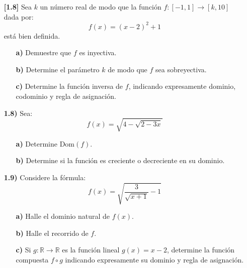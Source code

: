 \documentclass[letterpaper, 12pt]{article}
\begin{document}
\begin{enumerate}
    \item[\textbf{[1.8]}] Sea $k$ un número real de modo que la función $f:[-1,1]\rightarrow[k,10]$ dada por:
    \[
    f(x) = (x-2)^{2}+1
    \]
    está bien definida.
    \begin{itemize}
        \item[\textbf{a)}] Demuestre que $f$ es inyectiva.
        \item[\textbf{b)}] Determine el parámetro $k$ de modo que $f$ sea sobreyectiva.
        \item[\textbf{c)}] Determine la función inversa de $f$, indicando expresamente dominio, codominio y regla de asignación.
    \end{itemize}

    \item[\textbf{1.8)}] Sea:
    \[
    f(x) = \sqrt{4-\sqrt{2-3x}}
    \]
    \begin{itemize}
        \item[\textbf{a)}] Determine $\text{Dom}(f)$.
        \item[\textbf{b)}] Determine si la función es creciente o decreciente en su dominio.
    \end{itemize}

    \item[\textbf{1.9)}] Considere la fórmula:
    \[
    f(x) = \sqrt{\frac{3}{\sqrt{x+1}}-1}
    \]
    \begin{itemize}
        \item[\textbf{a)}] Halle el dominio natural de $f(x)$.
        \item[\textbf{b)}] Halle el recorrido de $f$.
        \item[\textbf{c)}] Si $g:\mathbb{R}\rightarrow\mathbb{R}$ es la función lineal $g(x)=x-2$, determine la función compuesta $f\circ g$ indicando expresamente su dominio y regla de asignación.
    \end{itemize}
\end{enumerate}
\newpage
\end{document}
